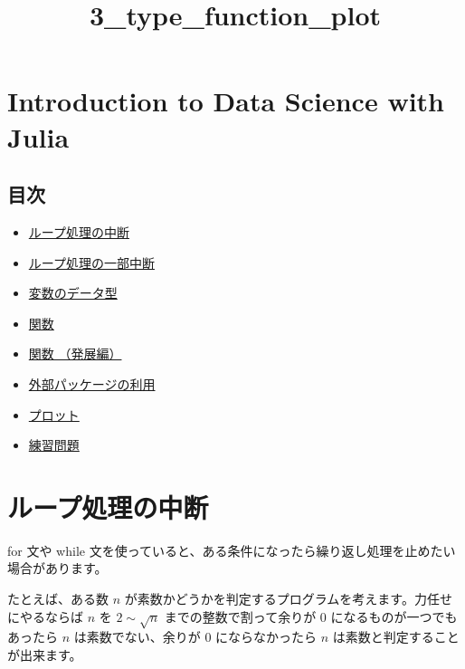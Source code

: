 \documentclass[a4paper,dvipdfmx,uplatex]{jsarticle}
\title{3\_type\_function\_plot}
\providecommand{\tightlist}{%
      \setlength{\itemsep}{0pt}\setlength{\parskip}{0pt}}
\begin{document}
    
    
    \maketitle
    
    

    
    \section{Introduction to Data Science with
Julia}\label{introduction-to-data-science-with-julia}

\subsection{目次}\label{ux76eeux6b21}

\begin{itemize}
\tightlist
\item
  \protect\hyperlink{ux30ebux30fcux30d7ux51e6ux7406ux306eux4e2dux65ad}{ループ処理の中断}
\item
  \protect\hyperlink{ux30ebux30fcux30d7ux51e6ux7406ux306eux4e00ux90e8ux4e2dux65ad}{ループ処理の一部中断}
\item
  \protect\hyperlink{ux5909ux6570ux306eux30c7ux30fcux30bfux578b}{変数のデータ型}
\item
  \protect\hyperlink{ux95a2ux6570}{関数}
\item
  \protect\hyperlink{ux95a2ux6570-uxff08ux767aux5c55ux7de8uxff09}{関数
  （発展編）}
\item
  \protect\hyperlink{ux5916ux90e8ux30d1ux30c3ux30b1ux30fcux30b8ux306eux5229ux7528}{外部パッケージの利用}
\item
  \protect\hyperlink{ux30d7ux30edux30c3ux30c8}{プロット}
\item
  \protect\hyperlink{ux7df4ux7fd2ux554fux984c}{練習問題}
\end{itemize}

    \section{ループ処理の中断}\label{ux30ebux30fcux30d7ux51e6ux7406ux306eux4e2dux65ad}

for 文や while
文を使っていると、ある条件になったら繰り返し処理を止めたい場合があります。

たとえば、ある数 \(n\)
が素数かどうかを判定するプログラムを考えます。力任せにやるならば \(n\)
を \(2 \sim \sqrt{n}\) までの整数で割って余りが \(0\)
になるものが一つでもあったら \(n\) は素数でない、余りが \(0\)
にならなかったら \(n\) は素数と判定することが出来ます。
\end{document}
